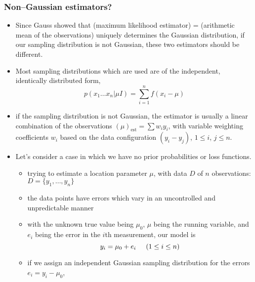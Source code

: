 \documentclass[../jaynes_prob_theory_notes.tex]{subfiles}
\begin{document}
            \subsubsection{Non--Gaussian estimators?}
                \begin{itemize}
                    \item Since Gauss showed that (maximum likelihood estimator) = (arithmetic mean of the observations) uniquely determines the Gaussian distribution, if our sampling distribution is not Gaussian, these two estimators should be different.
                    \item Most sampling distributions which are used are of the independent, identically distributed form,
                        \begin{equation*}
                            p(x_1 \ldots x_n|{\mu}I) = \sum^{n}_{i=1}f(x_i - \mu)
                        \end{equation*}
                    \item if the sampling distribution is not Gaussian, the estimator is usually a linear combination of the observations ${(\mu)}_{\mathrm{est}} = \sum w_i y_i$, with variable weighting coefficients $w_i$ based on the data configuration $(y_i - y_j)$, $1 \leq i$, $j \leq n$.
                    \item Let's consider a case in which we have no prior probabilities or loss functions.
                        \begin{itemize}
                            \item trying to estimate a location parameter $\mu$, with data $D$ of $n$ observations: $D = \{ y_1, \ldots, y_n \}$
                            \item the data points have errors which vary in an uncontrolled and unpredictable manner
                            \item with the unknown true value being ${\mu}_0$, $\mu$ being the running variable, and $e_i$ being the error in the $i$th measurement, our model is 
                                \begin{equation*}
                                    y_i = {\mu}_0 + e_i \hspace{0.5cm} (1 \leq i \leq n)
                                \end{equation*}
                            \item if we assign an independent Gaussian sampling distribution for the errors $e_i = y_i - {\mu}_0$,
                                \begin{equation*}

\end{equation*}
\end{itemize}
\end{itemize}
\end{document}
